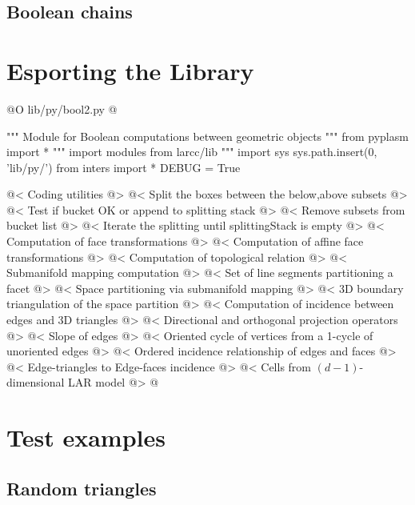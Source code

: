 \documentclass[11pt,oneside]{article}    %
\begin{document}
\subsection{Boolean chains}

\section{Esporting the Library}

@O lib/py/bool2.py
@{""" Module for Boolean computations between geometric objects """
from pyplasm import *
""" import modules from larcc/lib """
import sys
sys.path.insert(0, 'lib/py/')
from inters import *
DEBUG = True

@< Coding utilities @>
@< Split the boxes between the below,above subsets @>
@< Test if bucket OK or append to splitting stack @>
@< Remove subsets from bucket list @>
@< Iterate the splitting until splittingStack is empty @>
@< Computation of face transformations @>
@< Computation of affine face transformations @>
@< Computation of topological relation @>
@< Submanifold mapping computation @>
@< Set of line segments partitioning a facet @>
@< Space partitioning via submanifold mapping @>
@< 3D boundary triangulation of the space partition @>
@< Computation of incidence between edges and 3D triangles @>
@< Directional and orthogonal projection operators @>
@< Slope of edges @>
@< Oriented cycle of vertices from a 1-cycle of unoriented edges @>
@< Ordered incidence relationship of edges and faces @>
@< Edge-triangles to Edge-faces incidence @>
@< Cells from $(d-1)$-dimensional LAR model @>
@}

\section{Test examples}

\subsection{Random triangles}
\end{document}
